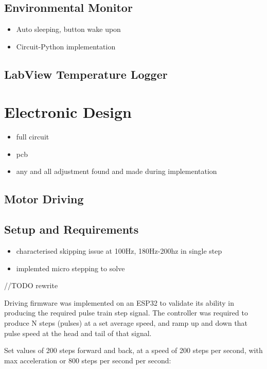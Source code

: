 \subsection{Environmental Monitor}

\begin{itemize}
    \item Auto sleeping, button wake upon
    \item Circuit-Python implementation
\end{itemize}

\subsection{LabView Temperature Logger}

\section{Electronic Design}

\begin{itemize}
    \item full circuit
    \item pcb
    \item any and all adjustment found and made during implementation
\end{itemize}

\subsection{Motor Driving}

\subsection{Setup and Requirements}

\begin{itemize}
    \item characterised skipping issue at 100Hz, 180Hz-200hz in single step
    \item implemted micro stepping to solve
\end{itemize}

//TODO rewrite

Driving firmware was implemented on an ESP32 to validate its ability in producing the required pulse train step signal. The controller was required to produce N steps (pulses) at a set average speed, and ramp up and down that pulse speed at the head and tail of that signal.

Set values of 200 steps forward and back, at a speed of 200 steps per second, with max acceleration or 800 steps per second per second:

